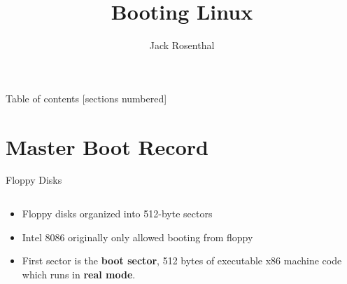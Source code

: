\documentclass{lug}
\title{Booting Linux}
\author{Jack Rosenthal}
\institute{Mines Linux Users Group}
\begin{document}
\begin{frame}{Table of contents}
    [sections numbered]
    \tableofcontents[hideallsubsections]
\end{frame}

\section{Master Boot Record}

\begin{frame}{Floppy Disks}
    \begin{columns}
        \begin{column}{0.7\textwidth}
            \begin{itemize}[<+->]
                \item Floppy disks organized into 512-byte sectors
                \item Intel 8086 originally only allowed booting from floppy
                \item First sector is the \textbf{boot sector}, 512 bytes of
                    executable x86 machine code which runs in \textbf{real
                    mode}.
            \end{itemize}
        \end{column}
        \begin{column}{0.3\textwidth}

\end{column}
\end{columns}
\end{frame}
\end{document}
